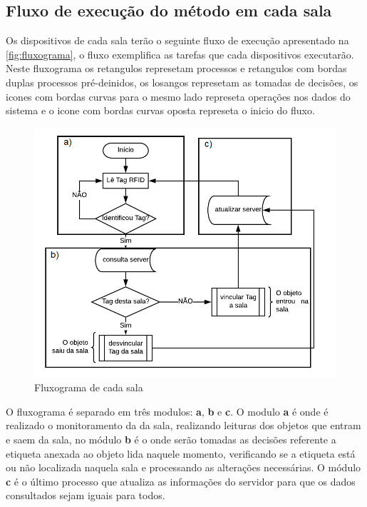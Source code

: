 \subsection{Fluxo de execução do método em cada sala}
Os dispositivos de cada sala terão o seguinte fluxo de execução apresentado na \autoref{fig:fluxograma}, o fluxo exemplifica as tarefas que cada dispositivos executarão. Neste fluxograma os retangulos represetam processos e retangulos com bordas duplas processos pré-deinidos, os losangos represetam as tomadas de decisões, os icones com bordas curvas para o mesmo lado represeta operações nos dados do sistema e o icone com bordas curvas oposta represeta o inicio do fluxo.
\begin{figure}[H]
              \caption{\label{fig:fluxograma}{Fluxograma de cada sala}}
              \centering
              \includegraphics[width=1\textwidth]{Figuras/fluxograma.png}
\end{figure}
\par
O fluxograma é separado em três modulos: \textbf{a}, \textbf{b} e \textbf{c}. O modulo \textbf{a} é onde é realizado o monitoramento da da sala, realizando leituras dos objetos que entram e saem da sala, no módulo \textbf{b} é o onde serão tomadas as decisões referente a etiqueta anexada ao objeto lida naquele momento, verificando se a etiqueta está ou não localizada naquela sala e processando as alterações necessárias. O módulo \textbf{c} é o último processo que atualiza as informações do servidor para que os dados consultados sejam iguais para todos. 
